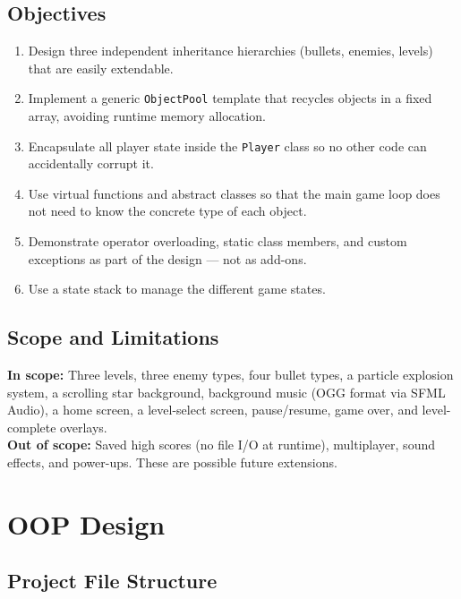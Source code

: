 \documentclass[11pt]{article}
\begin{document}
\subsection{Objectives}

\begin{enumerate}
    \item Design three independent inheritance hierarchies (bullets, enemies,
          levels) that are easily extendable.
    \item Implement a generic \texttt{ObjectPool} template that recycles objects
          in a fixed array, avoiding runtime memory allocation.
    \item Encapsulate all player state inside the \texttt{Player} class so no other code can accidentally corrupt it.
    \item Use virtual functions and abstract classes so that the main game loop
          does not need to know the concrete type of each object.
    \item Demonstrate operator overloading, static class members, and custom
          exceptions as part of the design --- not as add-ons.
    \item Use a state stack to manage the different game states.
\end{enumerate}

\subsection{Scope and Limitations}

\begin{notebox}
\textbf{In scope:} Three levels, three enemy types, four bullet types, a particle
explosion system, a scrolling star background, background music (OGG format via
SFML Audio), a home screen, a level-select screen, pause/resume, game over, and
level-complete overlays.\\[4pt]
\textbf{Out of scope:} Saved high scores (no file I/O at runtime), multiplayer,
sound effects, and power-ups. These are possible future extensions.
\end{notebox}

\clearpage
\section{OOP Design}

\subsection{Project File Structure}
\end{document}
